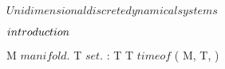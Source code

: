 \unit{ $ Unidimensional discrete dynamical systems $ }
{
	\introduction
	{ 
		$introduction\\$ 
	}

	{
		{
			M $ manifold $.
			T $ set $.
			\Phi :  \subset {}
		}
		{
			T \in \set{ \N, \Z, \R, \R^+ }
		}
		\denote
		{
			T \as $ time of $ ( M, T, \Phi )
		}
	}
	
	
	
	

}